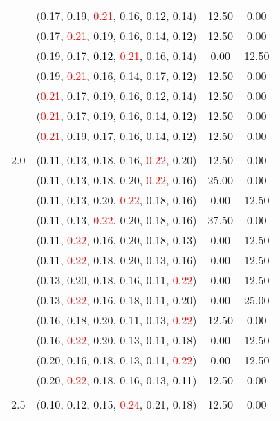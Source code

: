 \documentclass[10pt,a4paper]{report}
\begin{document}
\begin{center}
\begin{longtable}{clcc}
			&(0.17, 0.19, \textcolor{red}{0.21}, 0.16, \textcolor{black}{0.12}, 0.14)&12.50&0.00\\
			&(0.17, \textcolor{red}{0.21}, 0.19, 0.16, 0.14, \textcolor{black}{0.12})&12.50&0.00\\
			&(0.19, 0.17, \textcolor{black}{0.12}, \textcolor{red}{0.21}, 0.16, 0.14)&0.00&12.50\\
			&(0.19, \textcolor{red}{0.21}, 0.16, 0.14, 0.17, \textcolor{black}{0.12})&12.50&0.00\\
			&(\textcolor{red}{0.21}, 0.17, 0.19, 0.16, \textcolor{black}{0.12}, 0.14)&12.50&0.00\\
			&(\textcolor{red}{0.21}, 0.17, 0.19, 0.16, 0.14, \textcolor{black}{0.12})&12.50&0.00\\
			&(\textcolor{red}{0.21}, 0.19, 0.17, 0.16, 0.14, \textcolor{black}{0.12})&12.50&0.00\\
		&&&\\
		2.0			&(\textcolor{black}{0.11}, 0.13, 0.18, 0.16, \textcolor{red}{0.22}, 0.20)&12.50&0.00\\
			&(\textcolor{black}{0.11}, 0.13, 0.18, 0.20, \textcolor{red}{0.22}, 0.16)&25.00&0.00\\
			&(\textcolor{black}{0.11}, 0.13, 0.20, \textcolor{red}{0.22}, 0.18, 0.16)&0.00&12.50\\
			&(\textcolor{black}{0.11}, 0.13, \textcolor{red}{0.22}, 0.20, 0.18, 0.16)&37.50&0.00\\
			&(\textcolor{black}{0.11}, \textcolor{red}{0.22}, 0.16, 0.20, 0.18, 0.13)&0.00&12.50\\
			&(\textcolor{black}{0.11}, \textcolor{red}{0.22}, 0.18, 0.20, 0.13, 0.16)&0.00&12.50\\
			&(0.13, 0.20, 0.18, 0.16, \textcolor{black}{0.11}, \textcolor{red}{0.22})&0.00&12.50\\
			&(0.13, \textcolor{red}{0.22}, 0.16, 0.18, \textcolor{black}{0.11}, 0.20)&0.00&25.00\\
			&(0.16, 0.18, 0.20, \textcolor{black}{0.11}, 0.13, \textcolor{red}{0.22})&12.50&0.00\\
			&(0.16, \textcolor{red}{0.22}, 0.20, 0.13, \textcolor{black}{0.11}, 0.18)&0.00&12.50\\
			&(0.20, 0.16, 0.18, 0.13, \textcolor{black}{0.11}, \textcolor{red}{0.22})&0.00&12.50\\
			&(0.20, \textcolor{red}{0.22}, 0.18, 0.16, 0.13, \textcolor{black}{0.11})&12.50&0.00\\
		&&&\\
		2.5			&(\textcolor{black}{0.10}, 0.12, 0.15, \textcolor{red}{0.24}, 0.21, 0.18)&12.50&0.00\\

\end{longtable}
\end{center}
\end{document}
